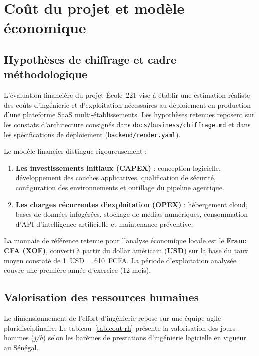 \chapter{Coût du projet et modèle économique}

\section{Hypothèses de chiffrage et cadre méthodologique}

L'évaluation financière du projet École~221 vise à établir une estimation réaliste des coûts d'ingénierie et d'exploitation nécessaires au déploiement en production d'une plateforme SaaS multi-établissements. Les hypothèses retenues reposent sur les constats d'architecture consignés dans \nolinkurl{docs/business/chiffrage.md} et dans les spécifications de déploiement (\nolinkurl{backend/render.yaml}).

Le modèle financier distingue rigoureusement :
\begin{enumerate}
    \item \textbf{Les investissements initiaux (CAPEX)} : conception logicielle, développement des couches applicatives, qualification de sécurité, configuration des environnements et outillage du pipeline agentique.
    \item \textbf{Les charges récurrentes d'exploitation (OPEX)} : hébergement cloud, bases de données infogérées, stockage de médias numériques, consommation d'API d'intelligence artificielle et maintenance préventive.
\end{enumerate}

La monnaie de référence retenue pour l'analyse économique locale est le \textbf{Franc CFA (XOF)}, converti à partir du dollar américain (\textbf{USD}) sur la base du taux moyen constaté de 1~USD = 610~FCFA. La période d'exploitation analysée couvre une première année d'exercice (12 mois).

\section{Valorisation des ressources humaines}

Le dimensionnement de l'effort d'ingénierie repose sur une équipe agile pluridisciplinaire. Le tableau~\ref{tab:cout-rh} présente la valorisation des jours-hommes (\emph{j/h}) selon les barèmes de prestations d'ingénierie logicielle en vigueur au Sénégal.

